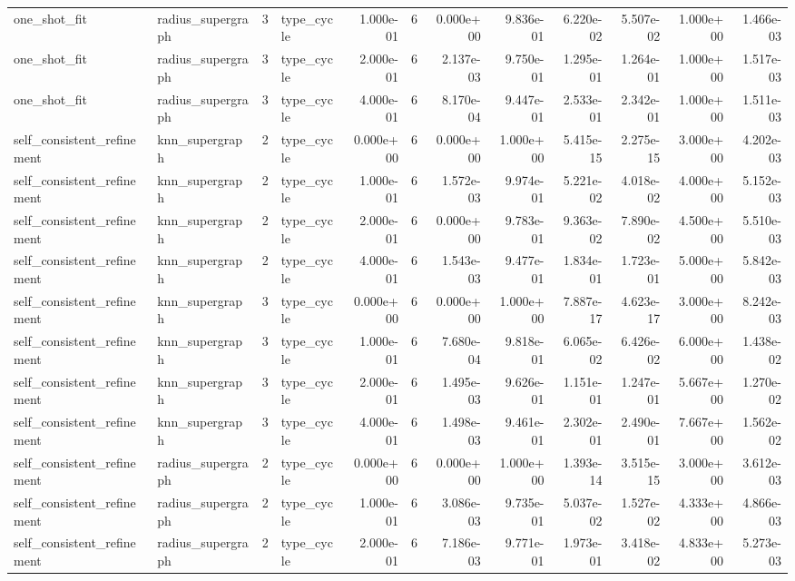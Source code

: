 \begin{tabular}{llrlrrrrrrrr}
one_shot_fit & radius_supergraph & 3 & type_cycle & 1.000e-01 & 6 & 0.000e+00 & 9.836e-01 & 6.220e-02 & 5.507e-02 & 1.000e+00 & 1.466e-03 \\
one_shot_fit & radius_supergraph & 3 & type_cycle & 2.000e-01 & 6 & 2.137e-03 & 9.750e-01 & 1.295e-01 & 1.264e-01 & 1.000e+00 & 1.517e-03 \\
one_shot_fit & radius_supergraph & 3 & type_cycle & 4.000e-01 & 6 & 8.170e-04 & 9.447e-01 & 2.533e-01 & 2.342e-01 & 1.000e+00 & 1.511e-03 \\
self_consistent_refinement & knn_supergraph & 2 & type_cycle & 0.000e+00 & 6 & 0.000e+00 & 1.000e+00 & 5.415e-15 & 2.275e-15 & 3.000e+00 & 4.202e-03 \\
self_consistent_refinement & knn_supergraph & 2 & type_cycle & 1.000e-01 & 6 & 1.572e-03 & 9.974e-01 & 5.221e-02 & 4.018e-02 & 4.000e+00 & 5.152e-03 \\
self_consistent_refinement & knn_supergraph & 2 & type_cycle & 2.000e-01 & 6 & 0.000e+00 & 9.783e-01 & 9.363e-02 & 7.890e-02 & 4.500e+00 & 5.510e-03 \\
self_consistent_refinement & knn_supergraph & 2 & type_cycle & 4.000e-01 & 6 & 1.543e-03 & 9.477e-01 & 1.834e-01 & 1.723e-01 & 5.000e+00 & 5.842e-03 \\
self_consistent_refinement & knn_supergraph & 3 & type_cycle & 0.000e+00 & 6 & 0.000e+00 & 1.000e+00 & 7.887e-17 & 4.623e-17 & 3.000e+00 & 8.242e-03 \\
self_consistent_refinement & knn_supergraph & 3 & type_cycle & 1.000e-01 & 6 & 7.680e-04 & 9.818e-01 & 6.065e-02 & 6.426e-02 & 6.000e+00 & 1.438e-02 \\
self_consistent_refinement & knn_supergraph & 3 & type_cycle & 2.000e-01 & 6 & 1.495e-03 & 9.626e-01 & 1.151e-01 & 1.247e-01 & 5.667e+00 & 1.270e-02 \\
self_consistent_refinement & knn_supergraph & 3 & type_cycle & 4.000e-01 & 6 & 1.498e-03 & 9.461e-01 & 2.302e-01 & 2.490e-01 & 7.667e+00 & 1.562e-02 \\
self_consistent_refinement & radius_supergraph & 2 & type_cycle & 0.000e+00 & 6 & 0.000e+00 & 1.000e+00 & 1.393e-14 & 3.515e-15 & 3.000e+00 & 3.612e-03 \\
self_consistent_refinement & radius_supergraph & 2 & type_cycle & 1.000e-01 & 6 & 3.086e-03 & 9.735e-01 & 5.037e-02 & 1.527e-02 & 4.333e+00 & 4.866e-03 \\
self_consistent_refinement & radius_supergraph & 2 & type_cycle & 2.000e-01 & 6 & 7.186e-03 & 9.771e-01 & 1.973e-01 & 3.418e-02 & 4.833e+00 & 5.273e-03 \\

\end{tabular}

